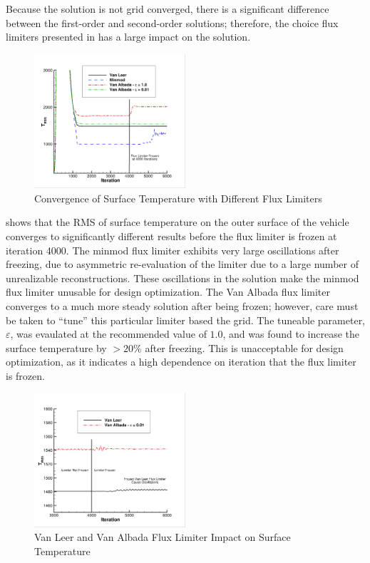 Because the solution is not grid converged, there is a significant difference
between the first-order and second-order solutions; therefore, the choice flux
limiters presented in  has a large impact on
the solution.  
\begin{figure}[h]
  \centering
  \includegraphics[width=0.5\textwidth]{figures/limiters/all-limiters.png}
  \caption{Convergence of Surface Temperature with Different Flux Limiters}
  \label{fig:all-limiters}
\end{figure}
 shows that the RMS of surface temperature on the outer
surface of the vehicle converges to significantly different results before
the flux limiter is frozen at iteration 4000.  The minmod flux limiter exhibits
very large oscillations after freezing, due to asymmetric re-evaluation of the
limiter due to a large number of unrealizable reconstructions.  These
oscillations in the solution make the minmod flux limiter unusable for design
optimization. The Van Albada flux limiter converges to a much more steady
solution after being frozen; however, care must be taken to ``tune'' this
particular limiter based the grid.  The tuneable parameter, $\varepsilon$, was
evaulated at the recommended value of $1.0$, and was found to increase the
surface temperature by $> 20\%$ after freezing.  This is unacceptable for design
optimization, as it indicates a high dependence on iteration that the flux
limiter is frozen.
\begin{figure}[h]
  \centering
  \includegraphics[width=0.5\textwidth]{figures/limiters/vanleer-vanalbada-frozen.png}
  \caption{Van Leer and Van Albada Flux Limiter Impact on Surface Temperature}
  \label{fig:vl-va-impact}
\end{figure}
